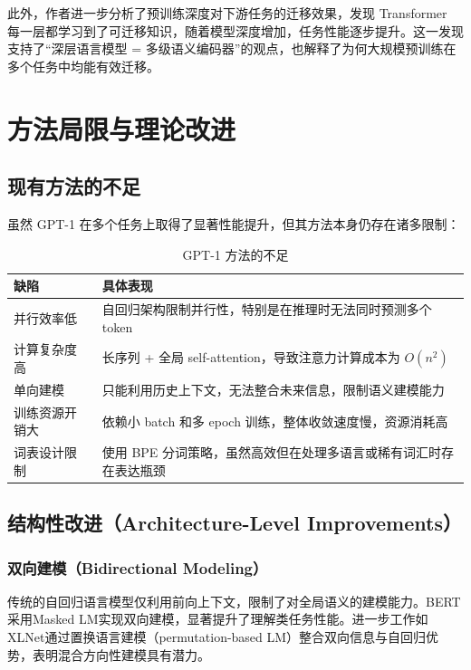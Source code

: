 \documentclass[a4paper,12pt]{article}
\begin{document}
此外，作者进一步分析了预训练深度对下游任务的迁移效果，发现 Transformer 每一层都学习到了可迁移知识，随着模型深度增加，任务性能逐步提升。这一发现支持了“深层语言模型 = 多级语义编码器”的观点，也解释了为何大规模预训练在多个任务中均能有效迁移。




\section{方法局限与理论改进}

\subsection{现有方法的不足}

虽然 GPT-1 在多个任务上取得了显著性能提升，但其方法本身仍存在诸多限制：

\begin{table}[H]
    \centering
    \caption{GPT-1 方法的不足}
    \begin{tabular}{|p{4cm}|p{8cm}|}
        \hline
        \textbf{缺陷} & \textbf{具体表现} \\
        \hline
        并行效率低 & 自回归架构限制并行性，特别是在推理时无法同时预测多个 token \\
        计算复杂度高 & 长序列 + 全局 self-attention，导致注意力计算成本为 $O(n^2)$ \\
        单向建模 & 只能利用历史上下文，无法整合未来信息，限制语义建模能力 \\
        训练资源开销大 & 依赖小 batch 和多 epoch 训练，整体收敛速度慢，资源消耗高 \\
        词表设计限制 & 使用 BPE 分词策略，虽然高效但在处理多语言或稀有词汇时存在表达瓶颈 \\
        \hline
    \end{tabular}
\end{table}

\subsection{结构性改进（Architecture-Level Improvements）}

\subsubsection{双向建模（Bidirectional Modeling）}

传统的自回归语言模型仅利用前向上下文，限制了对全局语义的建模能力。BERT采用Masked LM实现双向建模，显著提升了理解类任务性能。进一步工作如XLNet通过置换语言建模（permutation-based LM）整合双向信息与自回归优势，表明混合方向性建模具有潜力。
\end{document}

